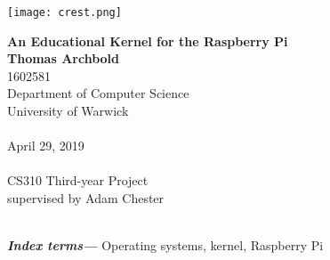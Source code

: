 \documentclass[10pt,a4paper]{article}
\providecommand{\keywords}[1]{\textbf{\textit{Index terms---}} #1}
\begin{document}
\begin{titlepage}
    \begin{center}

        \vspace*{2cm}
        \texttt{[image: crest.png]}

        \vspace*{1cm}
        {\Large \textbf{An Educational Kernel for the Raspberry Pi}} \\

        \vspace*{1cm}
        \textbf{Thomas Archbold} \\
        1602581 \\
        Department of Computer Science \\
        University of Warwick \\~\\

        April 29, 2019 \\~\\

        CS310 Third-year Project \\
        supervised by Adam Chester \\~\\

        \vfill

    \end{center}
\end{titlepage}



\keywords{Operating systems, kernel, Raspberry Pi}

\tableofcontents





% 
% 



\end{document}
